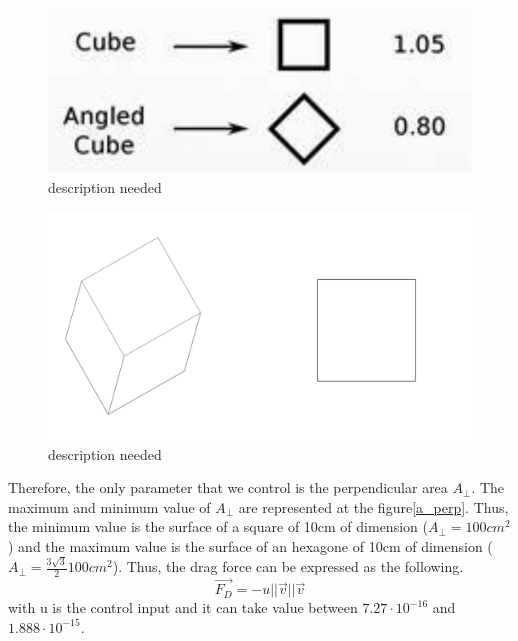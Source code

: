 \begin{table}[H]
	\begin{minipage}[b]{0.49\linewidth}
		\centering
		\begin{figure}[H]
			\centering
			\includegraphics[width=0.8\linewidth]{figures/drag_coef}
			\caption{description needed}
			\label{fig:MW}
		\end{figure}
	\end{minipage}\hfill
	\begin{minipage}[b]{0.49\linewidth}
		\centering
		\begin{figure}[H]
			\centering
			\includegraphics[width=1\linewidth]{figures/a_prep}
			\caption{description needed}
			\label{fig:cub}
		\end{figure}
	\end{minipage}
\end{table}
Therefore, the only parameter that we control is the perpendicular area $A_{\perp}$. The maximum and minimum value of $A_{\perp}$ are represented at the figure\ref{a_perp}. Thus, the minimum value is the surface of a square of 10cm of dimension ($A_{\perp} = 100cm^2$) and the maximum value is the surface of an hexagone of 10cm of dimension ($A_{\perp} = \frac{3\sqrt{3}}{2} 100cm^2$).
Thus, the drag force can be expressed as the following. 
\[
\vec{F_D} = -u ||\vec{v}|| \vec{v}
\]
with u is the control input and it can take value between $7.27 \cdot 10^{-16}$ and $1.888 \cdot 10^{-15}$.
